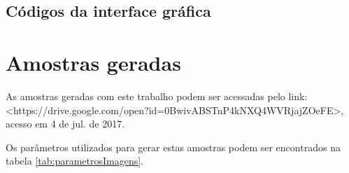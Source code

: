 \documentclass[
  12pt,       
  openright,      
  twoside,      
  a4paper,      
  english,      
  french,       
  spanish,      
  brazil,     
  ]{abntex2}
\begin{document}
\begin{apendicesenv}
\section{Códigos da interface gráfica}


\chapter{Amostras geradas}
\label{sec:apendice2}
As amostras geradas com este trabalho podem ser acessadas pelo link:\\ <https://drive.google.com/open?id=0BwivABSTnP4kNXQ4WVRjajZOeFE>, acesso em 4 de jul. de 2017.

Os parâmetros utilizados para gerar estas amostras podem ser encontrados na tabela \ref{tab:parametrosImagens}.

\end{apendicesenv}
\end{document}
